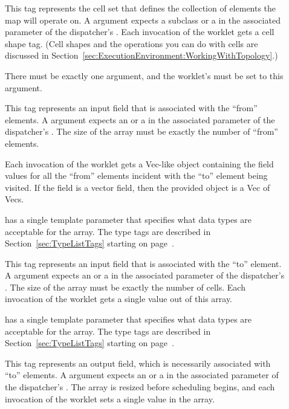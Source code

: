 \begin{description}
\item[] This tag represents the cell set that defines
  the collection of elements the map will operate on. A 
  argument expects a  subclass or a
   in the associated parameter of the
  dispatcher's . Each invocation of the worklet gets a
  cell shape tag. (Cell shapes and the operations you can do with cells are
  discussed in Section~\ref{sec:ExecutionEnvironment:WorkingWithTopology}.)

  There must be exactly one  argument, and the worklet's
   must be set to this argument.

\item[] This tag represents an input field that is
  associated with the ``from'' elements. A  argument
  expects an  or a
   in the associated parameter of the
  dispatcher's . The size of the array must be exactly the
  number of ``from'' elements.

  Each invocation of the worklet gets a Vec-like object containing the
  field values for all the ``from'' elements incident with the ``to''
  element being visited. If the field is a vector field, then the provided
  object is a Vec of Vecs.

   has a single template parameter that specifies what
  data types are acceptable for the array. The type tags are described in
  Section~\ref{sec:TypeListTags} starting on page~\pageref{TypeTagList}.

\item[] This tag represents an input field that is
  associated with the ``to'' element. A  argument expects
  an  or a 
  in the associated parameter of the dispatcher's . The
  size of the array must be exactly the number of cells. Each invocation of
  the worklet gets a single value out of this array.

   has a single template parameter that specifies what
  data types are acceptable for the array. The type tags are described in
  Section~\ref{sec:TypeListTags} starting on page~\pageref{TypeTagList}.

\item[] This tag represents an output field, which is
  necessarily associated with ``to'' elements. A  argument
  expects an  or a
   in the associated parameter of the
  dispatcher's . The array is resized before scheduling
  begins, and each invocation of the worklet sets a single value in the
  array.


\end{description}
